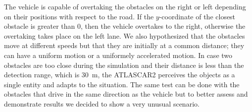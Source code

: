 The vehicle is capable of overtaking the obstacles on the right or left depending on their positions with respect to the road. If the $y$-coordinate of the closest obstacle is greater than 0, then the vehicle overtakes to the right, otherwise the overtaking takes place on the left lane. We also hypothesized that the obstacles move at different speeds but that they are initially at a common distance; they can have a uniform motion or a uniformely accelerated motion. In case two obstacles are too close during the simulation and their distance is less than the detection range, which is \SI{30}{m}, the ATLASCAR2 perceives the objects as a single entity and adapts to the situation. The same test can be done with the obstacles that drive in the same direction as the vehicle but to better assess and demonstrate results we decided to show a very unusual scenario.

